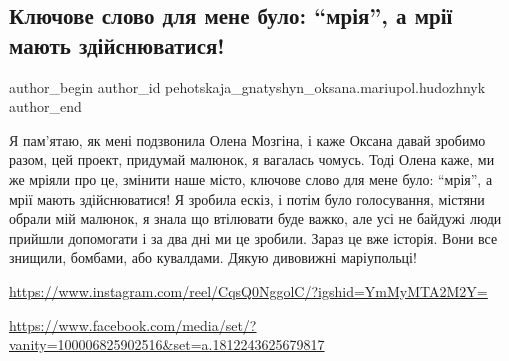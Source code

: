  
 
 
 
 

\subsection{Ключове слово для мене було: \enquote{мрія}, а мрії мають здійснюватися!}
\label{sec:06_04_2023.fb.pehotskaja_gnatyshyn_oksana.mariupol.hudozhnyk.1.lestnica_mrija}

\ifcmt
 author_begin
   author_id pehotskaja_gnatyshyn_oksana.mariupol.hudozhnyk
 author_end
\fi

Я пам'ятаю, як мені подзвонила Олена Мозгіна, і каже Оксана давай зробимо
разом, цей проект, придумай малюнок, я вагалась чомусь. Тоді Олена каже, ми же
мріяли про це, змінити наше місто, ключове слово для мене було: \enquote{мрія}, а мрії
мають здійснюватися! Я зробила ескіз, і потім було голосування, містяни обрали
мій малюнок, я знала що втілювати буде важко, але усі не байдужі люди прийшли
допомогати і за два дні ми це зробили. Зараз це вже історія. Вони все знищили,
бомбами, або кувалдами. Дякую дивовижні маріупольці!

\url{https://www.instagram.com/reel/CqsQ0NggolC/?igshid=YmMyMTA2M2Y=}

\url{https://www.facebook.com/media/set/?vanity=100006825902516&set=a.1812243625679817}

